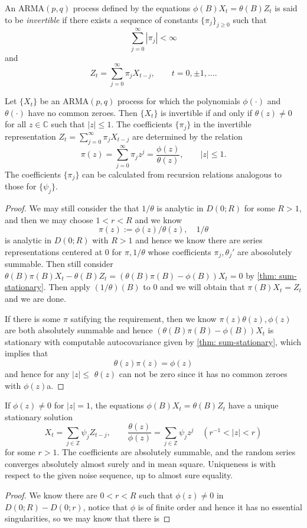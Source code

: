\begin{definition}[Invertibility]
An ARMA$(p,q)$ process defined by the equations
$\phi(B)X_t=\theta(B)Z_t$ is said to be \emph{invertible} if there exists
a sequence of constants $\{\pi_j\}_{j\geq0}$ such that
\[
\sum_{j=0}^{\infty}|\pi_j|<\infty
\]
and
\[
Z_t=\sum_{j=0}^{\infty}\pi_jX_{t-j},
\qquad t=0,\pm1,\ldots.
\]
\end{definition}

\begin{theorem}
Let $\{X_t\}$ be an ARMA$(p,q)$ process for which the polynomials
$\phi(\cdot)$ and $\theta(\cdot)$ have no common zeroes. Then $\{X_t\}$
is invertible if and only if $\theta(z)\neq0$ for all $z\in\mathbb{C}$
such that $|z|\leq1$. The coefficients $\{\pi_j\}$ in the invertible
representation $Z_t=\sum_{j=0}^{\infty}\pi_jX_{t-j}$ are determined by
the relation
\[
\pi(z)=\sum_{j=0}^{\infty}\pi_jz^j
=\frac{\phi(z)}{\theta(z)},
\qquad |z|\leq1.
\]
The coefficients $\{\pi_j\}$ can be calculated from recursion relations
analogous to those for $\{\psi_j\}$.
\end{theorem}
\begin{proof}
    We may still consider the that $1/\theta$ is analytic in $D(0;R)$ for some $R>1$, and then we may choose $1<r<R$ and we know
    \[
    \pi(z):= \phi(z)/\theta(z), \quad 1/\theta
    \]
    is analytic in $D(0;R)$ with $R > 1$ and hence we know there are series representations centered at $0$ for $\pi, 1/\theta$ whose coefficients $\pi_j, \theta_j'$ are abosolutely summable. Then still consider $\theta(B)\pi(B)X_t - \theta(B)Z_t = (\theta(B)\pi(B)-\phi(B))X_t = 0$ by \ref{thm: sum-stationary}. Then apply
    \(
    (1/\theta)(B)
    \)
    to $0$ and we will obtain that $\pi(B)X_t = Z_t$ and we are done.\par
    If there is some $\pi$ satifying the requirement, then we know $\pi(z)\theta(z),\phi(z)$ are both absolutely summable and hence $(\theta(B)\pi(B)-\phi(B))X_t$ is stationary with computable autocovariance given by \ref{thm: sum-stationary}, which implies that
    \[\theta(z)\pi(z) = \phi(z)\]
    and hence for any $|z| \leq$ $\theta(z)$ can not be zero since it has no common zeroes with $\phi(z)$a.
\end{proof}

\begin{theorem}
If $\phi(z)\ne0$ for $|z|=1$, the equations
$\phi(B)X_t=\theta(B)Z_t$ have a unique stationary solution
\[
X_t=\sum_{j\in\mathbb Z}\psi_jZ_{t-j},\qquad
\frac{\theta(z)}{\phi(z)}=\sum_{j\in\mathbb Z}\psi_jz^j
\quad(r^{-1}<|z|<r)
\]
for some $r>1$. The coefficients are absolutely summable, and the random
series converges absolutely almost surely and in mean square.
Uniqueness is with respect to the given noise sequence, up to almost sure equality.
\end{theorem}
\begin{proof}
    We know there are $0 < r<R$ such that $\phi(z) \neq 0$ in $D(0;R) -D(0;r)$, notice that $\phi$ is of finite order and hence it has no essential singularities, so we may know that there is
\end{proof}

